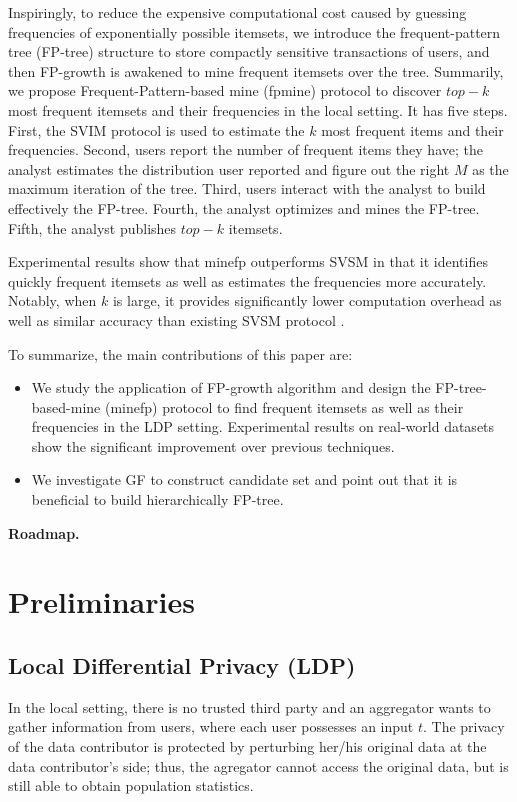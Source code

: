 \documentclass[conference]{IEEEtran}
\begin{document}
Inspiringly, to reduce the expensive computational cost caused by guessing frequencies of exponentially possible itemsets, we introduce the frequent-pattern tree (FP-tree)\cite{fp} structure to store compactly sensitive transactions of users, and then FP-growth\cite{fp} is awakened to mine frequent itemsets over the tree. Summarily, we propose {\color{red}Frequent-Pattern-based mine (fpmine)} protocol to discover $top-k$ most frequent itemsets and their frequencies in the local setting. {\color{red}It has five steps. First, the SVIM protocol is used to estimate the $k$ most frequent items and their frequencies. Second, users report the number of frequent items they have; the analyst estimates the distribution user reported and figure out the right $M$ as the maximum iteration of the tree. Third, users interact with the analyst to build effectively the FP-tree\cite{fp}. Fourth, the analyst optimizes and mines the FP-tree. Fifth, the analyst publishes $top-k$ itemsets.}

Experimental results show that {\color{red}minefp outperforms SVSM in that it identifies quickly frequent itemsets as well as estimates the frequencies more accurately. Notably, when $k$ is large, it provides significantly lower computation overhead as well as similar accuracy than existing SVSM protocol .}

{\color{red}
To summarize, the main contributions of this paper are:
\begin{itemize}
\item We study the application of FP-growth algorithm and design the FP-tree-based-mine (minefp) protocol to find frequent itemsets as well as their frequencies in the LDP setting. Experimental results on real-world datasets show the significant improvement over previous techniques.
\item We investigate GF to construct candidate set and point out that it is beneficial to build hierarchically FP-tree. 
\end{itemize}
}


\textbf{Roadmap.}

\section{Preliminaries}
\subsection{Local Differential Privacy (LDP)}
In the local setting, there is no trusted third party and an aggregator wants to gather information from users, where each user possesses an input $t$. The privacy of the data contributor is protected by perturbing her/his original data at the data contributor’s side; thus, the agregator cannot access the original data, but is still able to obtain population statistics.
\end{document}
